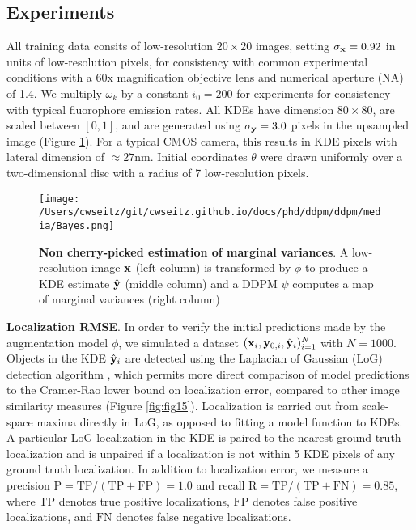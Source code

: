 \subsection{Experiments}

All training data consits of low-resolution $20\times 20$ images, setting $\sigma_{\bold{x}}=0.92$ in units of low-resolution pixels, for consistency with common experimental conditions with a 60x magnification objective lens and numerical aperture (NA) of 1.4. We multiply $\omega_{k}$ by a constant $i_{0}=200$ for experiments for consistency with typical fluorophore emission rates. All KDEs have dimension $80\times 80$, are scaled between $[0,1]$, and are generated using $\sigma_{\bold{y}}=3.0$ pixels in the upsampled image (Figure \ref{fig:fig12}). For a typical CMOS camera, this results in KDE pixels with lateral dimension of $\approx 27\mathrm{nm}$. Initial coordinates $\theta$ were drawn uniformly over a two-dimensional disc with a radius of 7 low-resolution pixels.


\begin{figure}
\centering
\texttt{[image: /Users/cwseitz/git/cwseitz.github.io/docs/phd/ddpm/ddpm/media/Bayes.png]}
\caption{\textbf{Non cherry-picked estimation of marginal variances}. A low-resolution image $\bold{x}$ (left column) is transformed by $\phi$ to produce a KDE estimate $\hat{\bold{y}}$ (middle column) and a DDPM $\psi$ computes a map of marginal variances (right column)}
\label{fig:fig12}
\end{figure}

\textbf{Localization RMSE}. In order to verify the initial predictions made by the augmentation model $\phi$, we simulated a dataset $(\bold{x}_i,\bold{y}_{0,i},\hat{\bold{y}}_{i})_{i=1}^{N}$ with $N=1000$. Objects in the KDE $\hat{\bold{y}}_{i}$  are detected using the Laplacian of Gaussian (LoG) detection algorithm \parencite{Kong2013}, which permits more direct comparison of model predictions to the Cramer-Rao lower bound on localization error, compared to other image similarity measures (Figure \ref{fig:fig15}). Localization is carried out from scale-space maxima directly in LoG, as opposed to fitting a model function to KDEs. A particular LoG localization in the KDE is paired to the nearest ground truth localization and is unpaired if a localization is not within 5 KDE pixels of any ground truth localization. In addition to localization error, we measure a precision $\mathrm{P = TP/(TP + FP)} = 1.0$ and recall $\mathrm{R = TP/(TP + FN)} = 0.85$, where $\mathrm{TP}$ denotes true positive localizations, $\mathrm{FP}$ denotes false positive localizations, and $\mathrm{FN}$ denotes false negative localizations.


